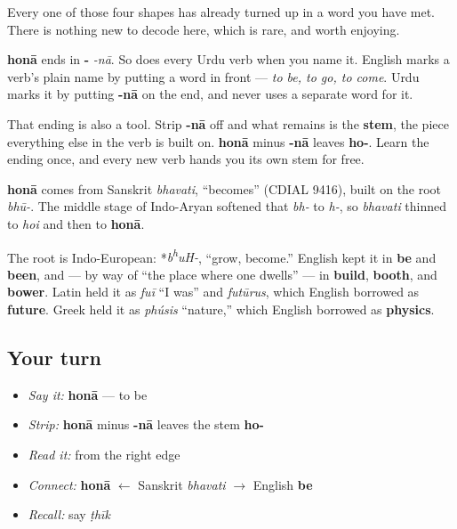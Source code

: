 Every one of those four shapes has already turned up in a word you have met. There is nothing new to decode here, which is rare, and worth enjoying.

\begin{grammarlens}[title={Grammar Lens: the ending that names every verb}]
\textbf{honā} ends in \textbf{-} \emph{-nā}. So does every Urdu verb when you name it. English marks a verb's plain name by putting a word in front — \emph{to be, to go, to come}. Urdu marks it by putting \textbf{-nā} on the end, and never uses a separate word for it.

That ending is also a tool. Strip \textbf{-nā} off and what remains is the \textbf{stem}, the piece everything else in the verb is built on. \textbf{honā} minus \textbf{-nā} leaves \textbf{ho-}. Learn the ending once, and every new verb hands you its own stem for free.
\end{grammarlens}

\begin{cousinweb}
\textbf{honā} comes from Sanskrit \emph{bhavati}, “becomes” (CDIAL 9416), built on the root \emph{bhū-}. The middle stage of Indo-Aryan softened that \emph{bh-} to \emph{h-}, so \emph{bhavati} thinned to \emph{hoi} and then to \textbf{honā}.

The root is Indo-European: *\emph{b\textsuperscript{h}uH-}, “grow, become.” English kept it in \textbf{be} and \textbf{been}, and — by way of “the place where one dwells” — in \textbf{build}, \textbf{booth}, and \textbf{bower}. Latin held it as \emph{fuī} “I was” and \emph{futūrus}, which English borrowed as \textbf{future}. Greek held it as \emph{phúsis} “nature,” which English borrowed as \textbf{physics}.
\end{cousinweb}

\subsection*{Your turn}
\begin{itemize}
\raggedright
  \item \emph{Say it:} \textbf{honā} — to be
  \item \emph{Strip:} \textbf{honā} minus \textbf{-nā} leaves the stem \textbf{ho-}
  \item \emph{Read it:} \textbf{} from the right edge
  \item \emph{Connect:} \textbf{honā} $\leftarrow$ Sanskrit \emph{bhavati} $\to$ English \textbf{be}
  \item \emph{Recall:} say \emph{ṭhīk}
\end{itemize}

